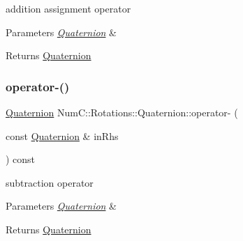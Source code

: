 addition assignment operator


\begin{DoxyParams}{Parameters}
{\em \mbox{\hyperlink{class_num_c_1_1_rotations_1_1_quaternion}{Quaternion}}} & \\
\hline
\end{DoxyParams}
\begin{DoxyReturn}{Returns}
\mbox{\hyperlink{class_num_c_1_1_rotations_1_1_quaternion}{Quaternion}} 
\end{DoxyReturn}
\mbox{\label{class_num_c_1_1_rotations_1_1_quaternion_ad8041e72f183b84584819b5ff94f6af1}} 
\subsubsection{\texorpdfstring{operator-\/()}{operator-()}}
{\footnotesize\ttfamily \mbox{\hyperlink{class_num_c_1_1_rotations_1_1_quaternion}{Quaternion}} Num\+C\+::\+Rotations\+::\+Quaternion\+::operator-\/ (\begin{DoxyParamCaption}\item[{const \mbox{\hyperlink{class_num_c_1_1_rotations_1_1_quaternion}{Quaternion}} \&}]{in\+Rhs }\end{DoxyParamCaption}) const\hspace{0.3cm}{\ttfamily [inline]}}

subtraction operator


\begin{DoxyParams}{Parameters}
{\em \mbox{\hyperlink{class_num_c_1_1_rotations_1_1_quaternion}{Quaternion}}} & \\
\hline
\end{DoxyParams}
\begin{DoxyReturn}{Returns}
\mbox{\hyperlink{class_num_c_1_1_rotations_1_1_quaternion}{Quaternion}} 
\end{DoxyReturn}
\mbox{\label{class_num_c_1_1_rotations_1_1_quaternion_afa8e9844ce6cb62dbbb3301ede8bbf47}} 
